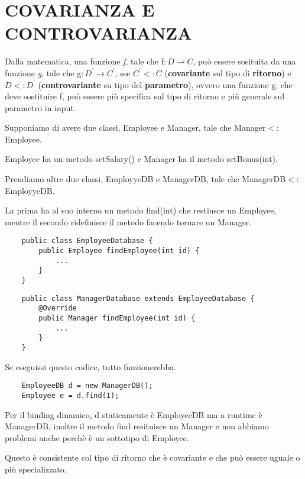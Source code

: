 \chapter{COVARIANZA E CONTROVARIANZA}

Dalla matematica, una funzione \textit{f}, tale che f$:D\rightarrow C$, può essere sosituita da una funzione \textit{g}, tale che g$:D^\prime\rightarrow C^\prime$, sse $C^\prime<:C$ 
(\textbf{covariante} sul tipo di \textbf{ritorno}) e $D<:D^\prime$ (\textbf{controvariante} su tipo del \textbf{parametro}), ovvero una funzione g, che deve 
sostituire f, può essere più specifica sul tipo di ritorno e più generale sul parametro in input.

Supponiamo di avere due classi, Employee e Manager, tale che Manager$<:$Employee.

Employee ha un metodo setSalary() e Manager ha il metodo setBonus(int).

Prendiamo altre due classi, EmployyeDB e ManagerDB, tale che ManagerDB$<:$EmployyeDB.

La prima ha al suo interno un metodo find(int) che restiusce un Employee, mentre il secondo ridefinisce il metodo facendo tornare un Manager.
\begin{multicols}{2}
    \begin{lstlisting}
    public class EmployeeDatabase {
        public Employee findEmployee(int id) {
            ...
        }
    }    
    \end{lstlisting}       
\columnbreak
    \begin{lstlisting}
    public class ManagerDatabase extends EmployeeDatabase {
        @Override
        public Manager findEmployee(int id) {
            ...
        }
    }
    \end{lstlisting}
\end{multicols}

Se eseguissi questo codice, tutto funzionerebba.

\begin{lstlisting}
    EmployeeDB d = new ManagerDB();
    Employee e = d.find(1);
\end{lstlisting}

Per il binding dinamico, d staticamente è EmployeeDB ma a runtime è ManagerDB, inoltre il metodo find resituisce un Manager e non abbiamo problemi anche perchè è un 
sottotipo di Employee.

Questo è consistente col tipo di ritorno che è covariante e che può essere uguale o più specializzato.

